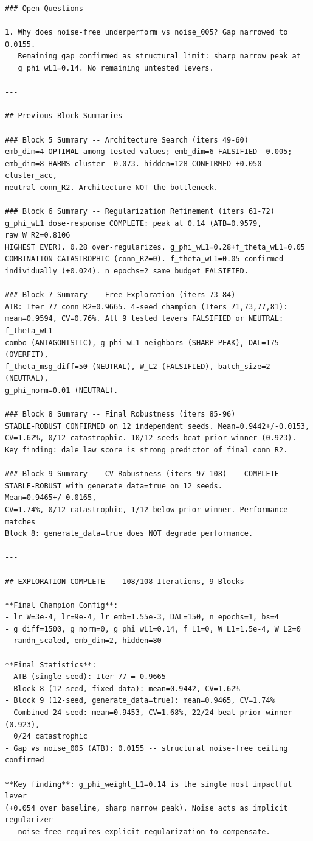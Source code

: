 \documentclass{article}
\begin{document}
\begin{tiny}
\begin{verbatim}
### Open Questions

1. Why does noise-free underperform vs noise_005? Gap narrowed to 0.0155.
   Remaining gap confirmed as structural limit: sharp narrow peak at
   g_phi_wL1=0.14. No remaining untested levers.

---

## Previous Block Summaries

### Block 5 Summary -- Architecture Search (iters 49-60)
emb_dim=4 OPTIMAL among tested values; emb_dim=6 FALSIFIED -0.005;
emb_dim=8 HARMS cluster -0.073. hidden=128 CONFIRMED +0.050 cluster_acc,
neutral conn_R2. Architecture NOT the bottleneck.

### Block 6 Summary -- Regularization Refinement (iters 61-72)
g_phi_wL1 dose-response COMPLETE: peak at 0.14 (ATB=0.9579, raw_W_R2=0.8106
HIGHEST EVER). 0.28 over-regularizes. g_phi_wL1=0.28+f_theta_wL1=0.05
COMBINATION CATASTROPHIC (conn_R2=0). f_theta_wL1=0.05 confirmed
individually (+0.024). n_epochs=2 same budget FALSIFIED.

### Block 7 Summary -- Free Exploration (iters 73-84)
ATB: Iter 77 conn_R2=0.9665. 4-seed champion (Iters 71,73,77,81):
mean=0.9594, CV=0.76%. All 9 tested levers FALSIFIED or NEUTRAL: f_theta_wL1
combo (ANTAGONISTIC), g_phi_wL1 neighbors (SHARP PEAK), DAL=175 (OVERFIT),
f_theta_msg_diff=50 (NEUTRAL), W_L2 (FALSIFIED), batch_size=2 (NEUTRAL),
g_phi_norm=0.01 (NEUTRAL).

### Block 8 Summary -- Final Robustness (iters 85-96)
STABLE-ROBUST CONFIRMED on 12 independent seeds. Mean=0.9442+/-0.0153,
CV=1.62%, 0/12 catastrophic. 10/12 seeds beat prior winner (0.923).
Key finding: dale_law_score is strong predictor of final conn_R2.

### Block 9 Summary -- CV Robustness (iters 97-108) -- COMPLETE
STABLE-ROBUST with generate_data=true on 12 seeds. Mean=0.9465+/-0.0165,
CV=1.74%, 0/12 catastrophic, 1/12 below prior winner. Performance matches
Block 8: generate_data=true does NOT degrade performance.

---

## EXPLORATION COMPLETE -- 108/108 Iterations, 9 Blocks

**Final Champion Config**:
- lr_W=3e-4, lr=9e-4, lr_emb=1.55e-3, DAL=150, n_epochs=1, bs=4
- g_diff=1500, g_norm=0, g_phi_wL1=0.14, f_L1=0, W_L1=1.5e-4, W_L2=0
- randn_scaled, emb_dim=2, hidden=80

**Final Statistics**:
- ATB (single-seed): Iter 77 = 0.9665
- Block 8 (12-seed, fixed data): mean=0.9442, CV=1.62%
- Block 9 (12-seed, generate_data=true): mean=0.9465, CV=1.74%
- Combined 24-seed: mean=0.9453, CV=1.68%, 22/24 beat prior winner (0.923),
  0/24 catastrophic
- Gap vs noise_005 (ATB): 0.0155 -- structural noise-free ceiling confirmed

**Key finding**: g_phi_weight_L1=0.14 is the single most impactful lever
(+0.054 over baseline, sharp narrow peak). Noise acts as implicit regularizer
-- noise-free requires explicit regularization to compensate.
\end{verbatim}
\end{tiny}
\end{document}
